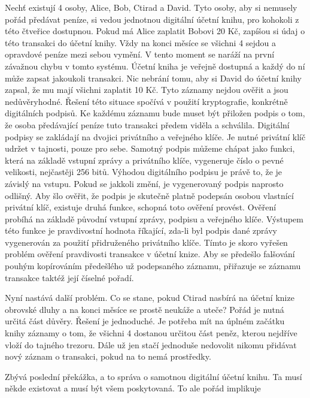 Nechť existují 4 osoby, Alice, Bob, Ctirad a David. Tyto osoby, aby si nemusely pořád předávat peníze, si vedou jednotnou digitální účetní knihu,
pro kohokoli z této čtveřice dostupnou. Pokud má Alice zaplatit Bobovi 20 Kč, zapíšou si údaj o této transakci do účetní knihy. Vždy na
konci měsíce se všichni 4 sejdou a opravdové peníze mezi sebou vymění. V tento moment se naráží na první závažnou chybu v tomto systému.
Účetní kniha je veřejně dostupná a každý do ní může zapsat jakoukoli transakci. Nic nebrání tomu, aby si David do účetní knihy zapsal, že
mu mají všichni zaplatit 10 Kč. Tyto záznamy nejdou ověřit a jsou nedůvěryhodné. Řešení této situace spočívá v použití kryptografie,
konkrétně digitálních podpisů. Ke každému záznamu bude muset být přiložen podpis o tom, že osoba předávající peníze tuto transakci předem
viděla a schválila. Digitální podpisy se zakládají na dvojici privátního a veřejného klíče. Je nutné privátní klíč udržet v tajnosti,
pouze pro sebe. Samotný podpis můžeme chápat jako funkci, která na základě vstupní zprávy a privátního klíče, vygeneruje číslo o pevné velikosti,
nejčastěji 256 bitů. Výhodou digitálního podpisu je právě to, že je závislý na vstupu. Pokud se jakkoli změní, je vygenerovaný podpis
naprosto odlišný. Aby šlo ověřit, že podpis je skutečně platně podepsán osobou vlastnící privátní klíč, existuje druhá funkce, schopná
toto ověření provést. Ověření probíhá na základě původní vstupní zprávy, podpisu a veřejného klíče. Výstupem této funkce je pravdivostní
hodnota říkající, zda-li byl podpis dané zprávy vygenerován za použití přidruženého privátního klíče. Tímto je skoro vyřešen problém ověření
pravdivosti transakce v účetní knize. Aby se předešlo falšování pouhým kopírováním předešlého už podepsaného záznamu, přiřazuje se záznamu
transakce taktéž její číselné pořadí.

Nyní nastává další problém. Co se stane, pokud Ctirad nasbírá na účetní knize obrovské dluhy a na konci měsíce se prostě neukáže a uteče?
Pořád je nutná určitá část důvěry. Řešení je jednoduché. Je potřeba mít na úplném začátku knihy záznamy o tom, že všichni 4 dostanou
určitou část peněz, kterou nejdříve vloží do tajného trezoru. Dále už jen stačí jednoduše nedovolit nikomu přidávat
nový záznam o transakci, pokud na to nemá prostředky.

Zbývá poslední překážka, a to správa o samotnou digitální účetní knihu. Ta musí někde existovat a musí být všem poskytovaná. To ale pořád
implikuje

